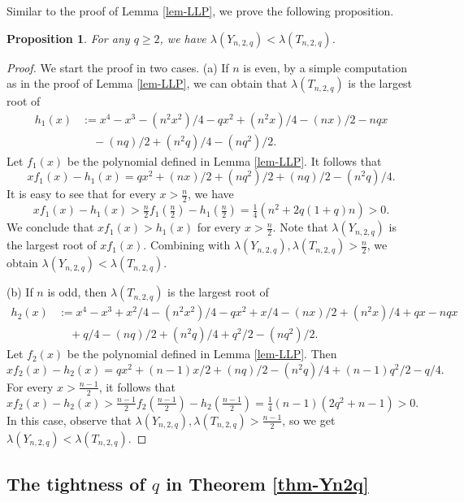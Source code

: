 \documentclass[11pt]{article}
\newtheorem{proposition}[theorem]{Proposition}
\begin{document}
Similar to the proof of Lemma \ref{lem-LLP}, 
we prove the following proposition.  
 
\begin{proposition} \label{prop-Y-less-T}
For any $q\ge 2$, we have $\lambda (Y_{n,2,q}) < \lambda (T_{n,2,q})$. 
\end{proposition}

\begin{proof}
We start the proof in two cases. 
(a) If $n$ is even, by a simple computation as in the proof of Lemma \ref{lem-LLP}, we can obtain that $\lambda (T_{n,2,q})$ is the largest root of 
\begin{align*}  h_1(x) &:= x^4 - x^3 - (n^2 x^2)/4 - q x^2 + (n^2 x)/4  - (n x)/2  - n q x \\ 
& \quad  -(n q)/2 + (n^2 q)/4 - (n q^2)/2  .  
\end{align*}
Let $f_1(x)$ be the polynomial defined in Lemma \ref{lem-LLP}. It follows that 
\[  x f_1(x) - h_1(x) = q x^2 + (n x)/2 + (n q^2)/2 + (n q)/2 - (n^2 q)/4.  \]
 It is easy to see that for every $x> \frac{n}{2}$, we have 
 \[  x f_1(x) - h_1(x) > \tfrac{n}{2}f_1(\tfrac{n}{2}) - h_1(\tfrac{n}{2}) 
 =  \tfrac{1}{4}  (n^2 + 2 q (1 + q)n )> 0. \]
We conclude that $x f_1(x) > h_1 (x)$ for every $x> \frac{n}{2}$. 
Note that $\lambda (Y_{n,2,q})$ is the largest root of $x f_1(x)$. 
Combining with $\lambda (Y_{n,2,q}), \lambda (T_{n,2,q}) > \frac{n}{2}$, 
we obtain $\lambda (Y_{n,2,q}) < \lambda (T_{n,2,q})$. 

(b) If $n$ is odd, then $\lambda (T_{n,2,q})$ is the largest root of 
\begin{align*}
h_2(x) &:= x^4 - x^3 + x^2/4 - (n^2 x^2)/4 - q x^2 + x/4 - (n x)/2 + (n^2 x)/4 + q x - n q x \\
&\quad + q/4 - (n q)/2 + (n^2 q)/4 + q^2/2 - (n q^2)/2 . 
\end{align*}
Let $f_2(x)$ be the polynomial defined in Lemma \ref{lem-LLP}. Then 
\[  x f_2 (x) - h_2(x) = q x^2 + ( n-1) x/2 
 + ( n q)/2 - (n^2 q)/4 +  ( n-1) q^2/2 -q/4 .   \]
 For every $x> \frac{n-1}{2}$, it follows that 
 \[ x f_2 (x) - h_2(x) > \tfrac{n-1}{2}f_2(\tfrac{n-1}{2}) - h_2(\tfrac{n-1}{2}) 
 = \tfrac{1}{4} (n-1) (2 q^2 + n -1) >0.
   \]
In this case, observe that $\lambda (Y_{n,2,q}), \lambda (T_{n,2,q}) > \frac{n-1}{2}$, so we get $\lambda (Y_{n,2,q}) < \lambda (T_{n,2,q})$. 
\end{proof} 


\subsection{The tightness of $q$ in Theorem \ref{thm-Yn2q}}
\end{document}
